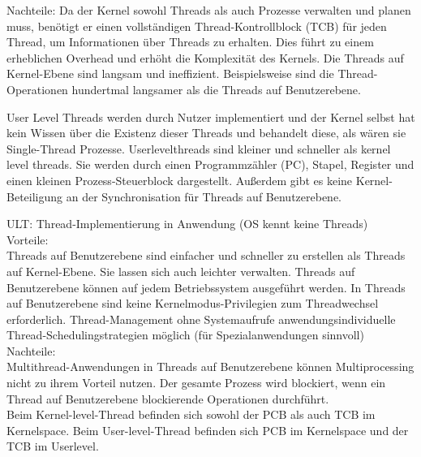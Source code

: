 \documentclass[a4paper]{article}
\begin{document}
\begin{itemize*}
\begin{itemize*}
        \item Nachteile: Da der Kernel sowohl Threads als auch Prozesse verwalten und planen muss, benötigt er einen vollständigen Thread-Kontrollblock (TCB) für jeden Thread, um Informationen über Threads zu erhalten. Dies führt zu einem erheblichen Overhead und erhöht die Komplexität des Kernels. Die Threads auf Kernel-Ebene sind langsam und ineffizient. Beispielsweise sind die Thread-Operationen hundertmal langsamer als die Threads auf Benutzerebene.
        \item User Level Threads werden durch Nutzer implementiert und der Kernel selbst hat kein Wissen über die Existenz dieser Threads und behandelt diese, als wären sie Single-Thread Prozesse. Userlevelthreads sind kleiner und schneller als kernel level threads. Sie werden durch einen Programmzähler (PC), Stapel, Register und einen kleinen Prozess-Steuerblock dargestellt. Außerdem gibt es keine Kernel-Beteiligung an der Synchronisation für Threads auf Benutzerebene.
        \item ULT: Thread-Implementierung in Anwendung (OS kennt keine Threads)\\
        Vorteile:\\
        Threads auf Benutzerebene sind einfacher und schneller zu erstellen als Threads auf Kernel-Ebene. Sie lassen sich auch leichter verwalten.
        Threads auf Benutzerebene können auf jedem Betriebssystem ausgeführt werden.
        In Threads auf Benutzerebene sind keine Kernelmodus-Privilegien zum Threadwechsel erforderlich.
        Thread-Management ohne Systemaufrufe
        anwendungsindividuelle Thread-Schedulingstrategien möglich (für Spezialanwendungen sinnvoll)\\
        Nachteile: \\
        Multithread-Anwendungen in Threads auf Benutzerebene können Multiprocessing nicht zu ihrem Vorteil nutzen.
        Der gesamte Prozess wird blockiert, wenn ein Thread auf Benutzerebene blockierende Operationen durchführt.\\
        Beim Kernel-level-Thread befinden sich sowohl der PCB als auch TCB im Kernelspace. Beim User-level-Thread befinden sich PCB im Kernelspace und der TCB im Userlevel.
    \end{itemize*}
\end{itemize*}
\end{document}
